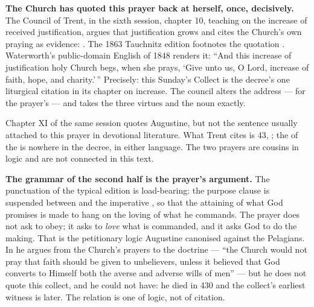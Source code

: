 \textbf{The Church has quoted this prayer back at herself, once, decisively.}
The Council of Trent, in the sixth session, chapter 10, teaching on the
increase of received justification, argues that justification grows and cites
the Church's own praying as evidence: . The 1863 Tauchnitz edition footnotes the quotation
. Waterworth's public-domain English
of 1848 renders it: ``And this increase of justification holy Church begs,
when she prays, `Give unto us, O Lord, increase of faith, hope, and
charity.'\,'' Precisely: this Sunday's Collect is the decree's one liturgical citation in its chapter
on increase. The council alters the address ---  for the
prayer's  --- and takes the three virtues
and the noun  exactly.

\begin{witnessnote}
Chapter XI of the same session quotes Augustine, but not the sentence usually
attached to this prayer in devotional literature. What Trent cites is
 43, ; the
 of the  is nowhere in the decree, in
either language. The two prayers are cousins in logic and are not connected in
this text.
\end{witnessnote}

\textbf{The grammar of the second half is the prayer's argument.} The
punctuation of the typical edition is load-bearing: the purpose clause
 is suspended between  and
the imperative , so that the attaining of
what God promises is made to hang on the loving of what he commands. The
prayer does not ask to obey; it asks to \textit{love} what is commanded, and
it asks God to do the making. That is the petitionary logic Augustine
canonised against the Pelagians. In  he argues from the Church's
prayers to the doctrine --- ``the Church would not pray that faith should be
given to unbelievers, unless it believed that God converts to Himself both the
averse and adverse wills of men'' --- but he does not quote this collect, and
he could not have: he died in 430 and the collect's earliest witness is later.
The relation is one of logic, not of citation.

